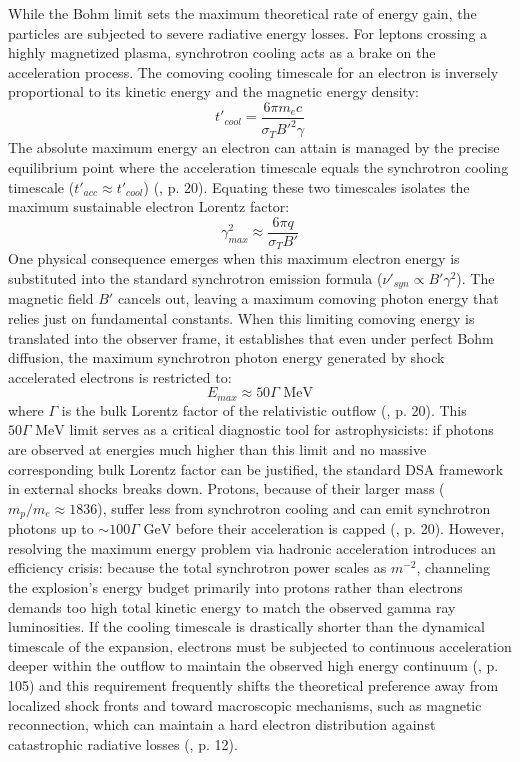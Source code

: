 \documentclass{aa} %
\begin{document}
While the Bohm limit sets the maximum theoretical rate of energy gain, the particles are subjected to severe radiative energy losses. For leptons crossing a highly magnetized plasma, synchrotron cooling acts as a brake on the acceleration process. The comoving cooling timescale for an electron is inversely proportional to its kinetic energy and the magnetic energy density:
$$t'_{cool} = \frac{6 \pi m_e c}{\sigma_T B'^2 \gamma}$$
The absolute maximum energy an electron can attain is managed by the precise equilibrium point where the acceleration timescale equals the synchrotron cooling timescale ($t'_{acc} \approx t'_{cool}$) (\citet{KumarandZhang2015}, p. 20).
Equating these two timescales isolates the maximum sustainable electron Lorentz factor:
$$\gamma_{max}^2 \approx \frac{6 \pi q}{\sigma_T B'}$$
One physical consequence emerges when this maximum electron energy is substituted into the standard synchrotron emission formula ($\nu'_{syn} \propto B' \gamma^2$). The magnetic field $B'$ cancels out, leaving a maximum comoving photon energy that relies just on fundamental constants. When this limiting comoving energy is translated into the observer frame, it establishes that even under perfect Bohm diffusion, the maximum synchrotron photon energy generated by shock accelerated electrons is restricted to:
$$E_{max} \approx 50 \Gamma \text{ MeV}$$
where $\Gamma$ is the bulk Lorentz factor of the relativistic outflow (\citet{KumarandZhang2015}, p. 20).
This $50 \Gamma \text{ MeV}$ limit serves as a critical diagnostic tool for astrophysicists: if photons are observed at energies much higher than this limit and no massive corresponding bulk Lorentz factor can be justified, the standard DSA framework in external shocks breaks down. Protons, because of their larger mass ($m_p/m_e \approx 1836$), suffer less from synchrotron cooling and can emit synchrotron photons up to $\sim 100 \Gamma \text{ GeV}$ before their acceleration is capped (\citet{KumarandZhang2015}, p. 20). However, resolving the maximum energy problem via hadronic acceleration introduces an efficiency crisis: because the total synchrotron power scales as $m^{-2}$, channeling the explosion's energy budget primarily into protons rather than electrons demands too high total kinetic energy to match the observed gamma ray luminosities.
If the cooling timescale is drastically shorter than the dynamical timescale of the expansion, electrons must be subjected to continuous acceleration deeper within the outflow to maintain the observed high energy continuum (\citet{KumarandZhang2015}, p. 105) and this requirement frequently shifts the theoretical preference away from localized shock fronts and toward macroscopic mechanisms, such as magnetic reconnection, which can maintain a hard electron distribution against catastrophic radiative losses (\citet{Peer2019}, p. 12).
\end{document}
